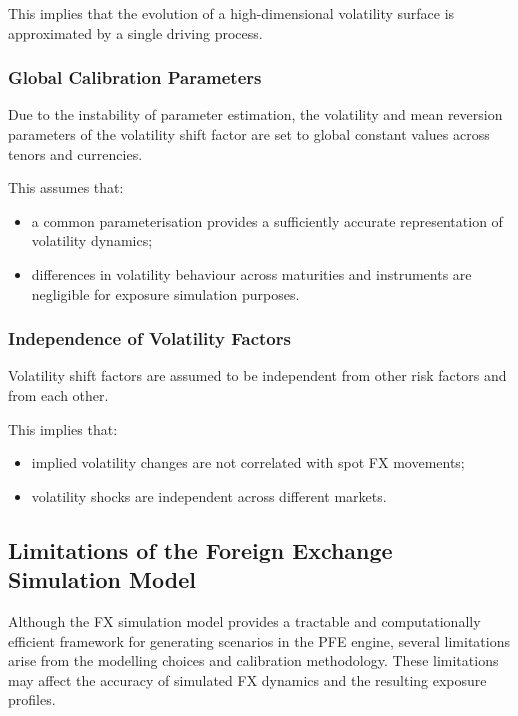 This implies that the evolution of a high-dimensional volatility surface is approximated by a single driving process.

\subsubsection{Global Calibration Parameters}

Due to the instability of parameter estimation, the volatility and mean reversion parameters of the volatility shift factor are set to global constant values across tenors and currencies.

This assumes that:

\begin{itemize}
	\item a common parameterisation provides a sufficiently accurate representation of volatility dynamics;
	\item differences in volatility behaviour across maturities and instruments are negligible for exposure simulation purposes.
\end{itemize}

\subsubsection{Independence of Volatility Factors}

Volatility shift factors are assumed to be independent from other risk factors and from each other.

This implies that:

\begin{itemize}
	\item implied volatility changes are not correlated with spot FX movements;
	\item volatility shocks are independent across different markets.
\end{itemize}

 

\newpage

\subsection{Limitations of the Foreign Exchange Simulation Model}

Although the FX simulation model provides a tractable and computationally efficient framework for generating scenarios in the PFE engine, several limitations arise from the modelling choices and calibration methodology. These limitations may affect the accuracy of simulated FX dynamics and the resulting exposure profiles.

